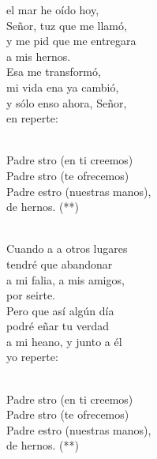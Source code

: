 \begin{cancion}%
	el mar he oído hoy,\\
	Señor, tuz que me llamó,\\
	y me pid que me entregara \\
	a mis hernos.\\
	Esa  me transformó,\\
	mi vida ena ya cambió,\\
	y sólo enso ahora, Señor,\\
	en reperte:\\\jump\\
	\begin{chorus}%
	Padre stro (en ti creemos)\\
	Padre stro (te ofrecemos)\\
	Padre estro (nuestras manos),\\
	de hernos. (**)\\
	\end{chorus}%
	\jump\\
	Cuando a a otros lugares\\
	tendré que abandonar\\
	a mi falia, a mis amigos,\\
	por seirte.\\
	Pero  que así algún día\\
	podré eñar tu verdad\\
	a mi heano, y junto a él\\
	yo reperte:\\\jump\\
	\begin{chorus}%
	Padre stro (en ti creemos)\\
	Padre stro (te ofrecemos)\\
	Padre estro (nuestras manos),\\
	de hernos. (**)\\
	\end{chorus}%
	\jump\\
\end{cancion}%
